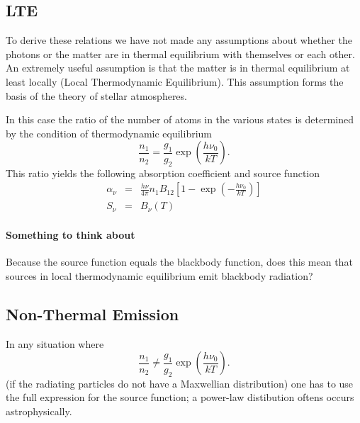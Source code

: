 \subsection{LTE}
\label{sec:lte}
To derive these relations we have not made any assumptions about
whether the photons or the matter are in thermal equilibrium with
themselves or each other.  An extremely useful assumption is that the
matter is in thermal equilibrium at least locally (Local Thermodynamic
Equilibrium).  This assumption forms the basis of the theory of stellar
atmospheres.

In this case the ratio of the number of atoms in the various states is
determined by the condition of thermodynamic equilibrium
\begin{equation}
\frac{n_1}{n_2} = \frac{g_1}{g_2} \exp \left (\frac{h\nu_0}{kT}\right).
\label{eq:79}
\end{equation}
This ratio yields the following absorption coefficient and source
function
\begin{eqnarray}
\label{eq:80}
\alpha_\nu &=& \frac{h\nu}{4\pi} n_1 B_{12} \left [ 1 - \exp
\left (-\frac{h\nu_0}{kT} \right ) \right] \\
S_\nu &=& B_\nu(T)
\label{eq:81}
\end{eqnarray}

\paragraph{Something to think about}  Because the source function
equals the blackbody function, does this mean that sources in local
thermodynamic equilibrium emit blackbody radiation?

\subsection{Non-Thermal Emission}
\label{sec:non-thermal-emission}
In any situation where 
\begin{equation}
\frac{n_1}{n_2} \neq \frac{g_1}{g_2} \exp \left (\frac{h\nu_0}{kT}\right).
\label{eq:82}
\end{equation}
(\ie if the radiating particles do not have a Maxwellian distribution)
one has to use the full expression for the source function; a
power-law distibution oftens occurs astrophysically.

